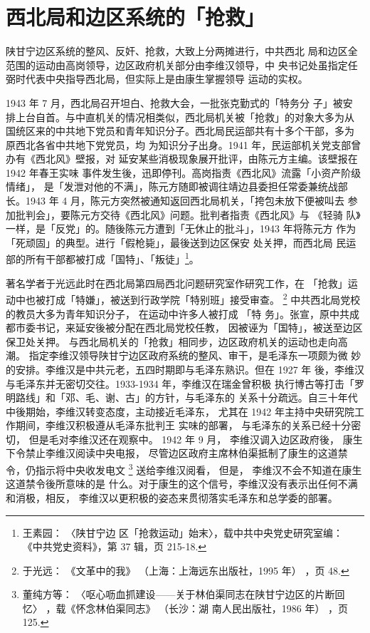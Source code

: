 \section{西北局和边区系统的「抢救」}

陕甘宁边区系统的整风、反奸、抢救，大致上分两摊进行，中共西北
局和边区全范围的运动由高岗领导，边区政府机关部分由李维汉领导，中
央书记处虽指定任弼时代表中央指导西北局，但实际上是由康生掌握领导
运动的实权。

1943 年 7 月，西北局召开坦白、抢救大会，一批张克勤式的「特务分 子」被安
排上台自首。与中直机关的情况相类似，西北局机关被「抢救」的对象大多为从
国统区来的中共地下党员和青年知识分子。西北局民运部共有十多个干部，多为
原西北各省中共地下党党员，均 为知识分子出身。1941 年，民运部机关党支部曾
办有《西北风》壁报，对 延安某些消极现象展开批评，由陈元方主编。该壁报在
1942 年春王实味 事件发生後，迅即停刊。高岗指责《西北风》流露「小资产阶级
情绪」， 是「发泄对他的不满」，陈元方随即被调往靖边县委担任常委兼统战部
长。1943 年 4 月，陈元方突然被通知返回西北局机关，「挎包未放下便被叫去
参加批判会」，要陈元方交待《西北风》问题。批判者指责《西北风》与 《轻骑
队》一样，是「反党」的。随後陈元方遭到「无休止的批斗」，1943 年将陈元方
作为「死顽固」的典型。进行「假枪毙」，最後送到边区保安 处关押，而西北局
民运部的所有干部都被打成「国特」、「叛徒」\footnote{王素园： 〈陕甘宁边
区「抢救运动」始末〉，载中共中央党史研究室编： 《中共党史资料》，第 37
辑，页 215-18.}。

著名学者于光远此时在西北局第四局西北问题研究室作研究工作，在
「抢救」运动中也被打成「特嫌」，被送到行政学院「特别班」接受审查。
\footnote{于光远：
《文革中的我》
（上海：上海远东出版社，1995 年）
，页 48.}
中共西北局党校的教员大多为青年知识分子，
在运动中许多人被打成
「特
务」。张宣，原中共成都市委书记，来延安後被分配在西北局党校任教，
因被诬为「国特」，被送至边区保卫处关押。
与西北局机关的「抢救」相同步，边区政府机关的运动也走向高潮。
指定李维汉领导陕甘宁边区政府系统的整风、审干，是毛泽东一项颇为微
妙的安排。李维汉是中共元老，五四时期即与毛泽东熟识。但在 1927 年
後，李维汉与毛泽东并无密切交往。1933-1934 年，李维汉在瑞金曾积极
执行博古等打击「罗明路线」和「邓、毛、谢、古」的方针，与毛泽东的
关系十分疏远。自三十年代中後期始，李维汉转变态度，主动接近毛泽东，
尤其在 1942 年主持中央研究院工作期间，李维汉积极遵从毛泽东批判王
实味的部署，
与毛泽东的关系已经十分密切，
但是毛对李维汉还在观察中。
1942 年 9 月，
李维汉调入边区政府後，
康生下令禁止李维汉阅读中央电报，
尽管边区政府主席林伯渠抵制了康生的这道禁令，仍指示将中央收发电文
\footnote{董纯方等：
〈呕心呖血抓建设——关于林伯渠同志在陕甘宁边区的片断回忆〉
，载《怀念林伯渠同志》
（长沙：湖
南人民出版社，1986 年）
，页 125.}
送给李维汉阅看， 但是，
李维汉不会不知道在康生这道禁令後所意味的是
什么。对于康生的这个信号，李维汉没有表示出任何不满和消极，相反，
李维汉以更积极的姿态来贯彻落实毛泽东和总学委的部署。
 
